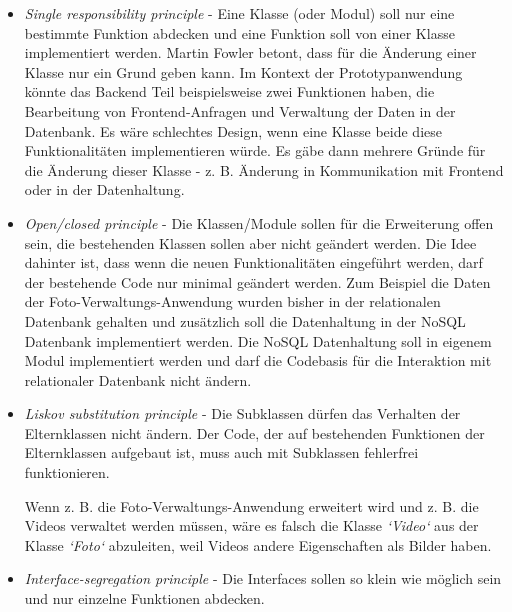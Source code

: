 \begin{itemize}

\item \textit{Single responsibility principle} - Eine Klasse (oder Modul) soll nur eine bestimmte Funktion abdecken und eine Funktion soll von einer Klasse implementiert werden. Martin Fowler betont, dass für die Änderung einer Klasse nur ein Grund geben kann. Im Kontext der Prototypanwendung könnte das Backend Teil beispielsweise zwei Funktionen haben, die Bearbeitung von Frontend-Anfragen und Verwaltung der Daten in der Datenbank. Es wäre schlechtes Design, wenn eine Klasse beide diese Funktionalitäten implementieren würde. Es gäbe dann mehrere Gründe für die Änderung dieser Klasse - z. B. Änderung in Kommunikation mit Frontend oder in der Datenhaltung.

\item \textit{Open/closed principle} - Die Klassen/Module sollen für die Erweiterung offen sein, die bestehenden Klassen sollen aber nicht geändert werden. Die Idee dahinter ist, dass wenn die neuen Funktionalitäten eingeführt werden, darf der bestehende Code nur minimal geändert werden. Zum Beispiel die Daten der Foto-Verwaltungs-Anwendung wurden bisher in der relationalen Datenbank gehalten und zusätzlich soll die Datenhaltung in der NoSQL Datenbank implementiert werden. Die NoSQL Datenhaltung soll in eigenem Modul implementiert werden und darf die Codebasis für die Interaktion mit relationaler Datenbank nicht ändern. 

\item \textit{Liskov substitution principle} - Die Subklassen dürfen das Verhalten der Elternklassen nicht ändern. Der Code, der auf bestehenden Funktionen der Elternklassen aufgebaut ist, muss auch mit Subklassen fehlerfrei funktionieren.

Wenn z. B. die Foto-Verwaltungs-Anwendung erweitert wird und z. B. die Videos verwaltet werden müssen, wäre es falsch die Klasse \textit{`Video`} aus der Klasse \textit{`Foto`} abzuleiten, weil Videos andere Eigenschaften als Bilder haben.

\item \textit{Interface-segregation principle} - Die Interfaces sollen so klein wie möglich sein und nur einzelne Funktionen abdecken.


\end{itemize}
